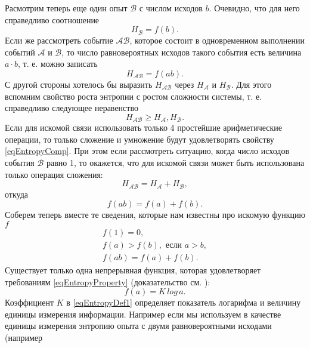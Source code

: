 Расмотрим теперь еще один опыт $\mathcal{B}$ с числом исходов
$b$. Очевидно, что для него справедливо соотношение
\[
H_{\mathcal{B}} = f\left(b\right).
\]
Если же рассмотреть событие $\mathcal{A}\mathcal{B}$,
которое состоит в одновременном выполнении событий $\mathcal{A}$ и
$\mathcal{B}$, то число равновероятных исходов такого
события есть величина $a\cdot b$, т. е. можно записать
\[
H_{\mathcal{A}\mathcal{B}} = f\left(ab\right).
\]
С другой стороны хотелось бы выразить $H_{\mathcal{A}\mathcal{B}}$
через $H_{\mathcal{A}}$ и $H_{\mathcal{B}}$. Для этого вспомним
свойство роста энтропии с ростом сложности системы, т. е. справедливо
следующее неравенство
\begin{equation}
H_{\mathcal{A}\mathcal{B}} \ge H_{\mathcal{A}}, H_{\mathcal{B}}.
\label{eqEntropyComp}
\end{equation}
Если для искомой связи использовать только 4 простейшие арифметические
операции, то только сложение и умножение будут удовлетворять свойству
\eqref{eqEntropyComp}. При этом если рассмотреть ситуацию, когда число
исходов события $\mathcal{B}$ равно 1, то окажется, что для искомой
связи может быть использована только операция сложения:
\begin{equation}
H_{\mathcal{A}\mathcal{B}} = H_{\mathcal{A}} + H_{\mathcal{B}},
\nonumber
\end{equation}
откуда
\begin{equation}
f\left(ab\right) = f\left(a\right) + f\left(b\right).
\nonumber
\end{equation}
Соберем теперь вместе те сведения, которые нам известны про искомую
функцию $f$
\begin{eqnarray}
f\left(1\right) = 0,
\nonumber \\
f\left(a\right) > f\left(b\right), \mbox{ если } a > b,
\nonumber \\
f\left(a b\right) = f\left(a\right) + f\left(b\right).
\label{eqEntropyProperty}
\end{eqnarray}
Существует только одна непрерывная функция, которая удовлетворяет
требованиям \eqref{eqEntropyProperty} (доказательство
см. \cite{bYaglom}):
\begin{equation}
f\left(a\right) = K\,log\,a.
\label{eqEntropyDef1}
\end{equation}
Коэффициент $K$ в \eqref{eqEntropyDef1} определяет показатель логарифма и величину единицы
измерения информации. Например если мы используем в качестве единицы
измерения энтропию опыта с двумя равновероятными исходами (например
